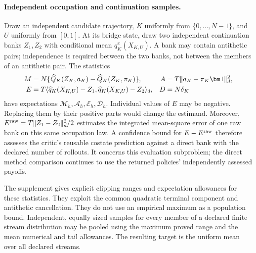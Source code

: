 \paragraph*{Independent occupation and continuation samples.}
Draw an independent candidate trajectory, $K$ uniformly from
$\{0,\ldots,N-1\}$, and $U$ uniformly from $[0,1]$. At its bridge
state, draw two independent continuation banks $Z_1,Z_2$ with
conditional mean $q_K^\pi(X_{K,U})$. A bank may contain antithetic
pairs; independence is required between the two banks, not between
the members of an antithetic pair. The statistics
\begin{align}
 M&=N\{\widehat Q_K(Z_K,a_K)-\widehat Q_K(Z_K,\pi_K)\},
 &A&=T\|a_K-\pi_K\bm1\|_d^2,\notag\\
 E&=T\langle\widehat q_K(X_{K,U})-Z_1,
                    \widehat q_K(X_{K,U})-Z_2\rangle_d,
 &D&=N\delta_K
 \label{eq:r15statistics}
\end{align}
have expectations $\mathcal M_h,\mathcal A_h,\mathcal E_h,
\mathcal D_h$. Individual values of $E$ may be negative. Replacing
them by their positive parts would change the estimand. Moreover,
$E^{\rm raw}=T\|Z_1-Z_2\|_d^2/2$ estimates the integrated mean-square
error of one raw bank on this same occupation law. A confidence bound
for $E-E^{\rm raw}$ therefore assesses the critic's reusable costate
prediction against a direct bank with the declared number of rollouts.
It concerns this evaluation subproblem; the direct method comparison
continues to use the returned policies' independently assessed payoffs.

The supplement gives explicit clipping ranges and expectation
allowances for these statistics. They exploit the common quadratic
terminal component and antithetic cancellation. They do not use an
empirical maximum as a population bound. Independent, equally sized
samples for every member of a declared finite stream distribution may
be pooled using the maximum proved range and the mean numerical and
tail allowances. The resulting target is the uniform mean over all
declared streams.

